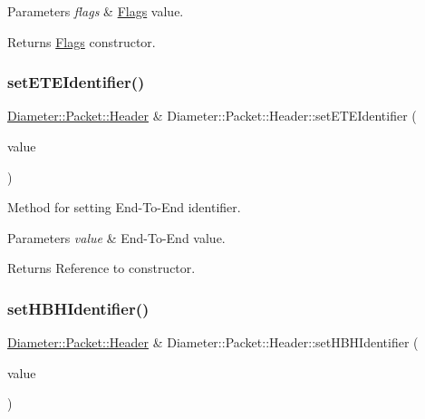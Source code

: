 \begin{DoxyParams}{Parameters}
{\em flags} & \hyperlink{classDiameter_1_1Packet_1_1Header_1_1Flags}{Flags} value. \\
\hline
\end{DoxyParams}
\begin{DoxyReturn}{Returns}
\hyperlink{classDiameter_1_1Packet_1_1Header_1_1Flags}{Flags} constructor. 
\end{DoxyReturn}
\mbox{\label{classDiameter_1_1Packet_1_1Header_a189b15e15e11b78c0a8cb9d90b51e5b0}} 
\subsubsection{\texorpdfstring{set\+E\+T\+E\+Identifier()}{setETEIdentifier()}}
{\footnotesize\ttfamily \hyperlink{classDiameter_1_1Packet_1_1Header}{Diameter\+::\+Packet\+::\+Header} \& Diameter\+::\+Packet\+::\+Header\+::set\+E\+T\+E\+Identifier (\begin{DoxyParamCaption}\item[{E\+T\+E\+Type}]{value }\end{DoxyParamCaption})}



Method for setting End-\/\+To-\/\+End identifier. 


\begin{DoxyParams}{Parameters}
{\em value} & End-\/\+To-\/\+End value. \\
\hline
\end{DoxyParams}
\begin{DoxyReturn}{Returns}
Reference to constructor. 
\end{DoxyReturn}
\mbox{\label{classDiameter_1_1Packet_1_1Header_a5e4506d6ecce87505f73e34d9c9ec043}} 
\subsubsection{\texorpdfstring{set\+H\+B\+H\+Identifier()}{setHBHIdentifier()}}
{\footnotesize\ttfamily \hyperlink{classDiameter_1_1Packet_1_1Header}{Diameter\+::\+Packet\+::\+Header} \& Diameter\+::\+Packet\+::\+Header\+::set\+H\+B\+H\+Identifier (\begin{DoxyParamCaption}\item[{H\+B\+H\+Type}]{value }\end{DoxyParamCaption})}



